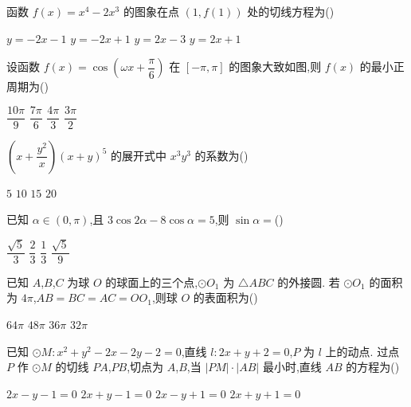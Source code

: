 \begin{problem}
函数 \(f(x)=x^4-2x^3\) 的图象在点 \(\left( 1,f\left( 1 \right) \right)\) 处的切线方程为(\quad)

\choices
    {\(y=-2x-1\)}
    {\(y=-2x+1\)}
    {\(y=2x-3\)}
    {\(y=2x+1\)}

\end{problem}

\begin{problem}
设函数 \(f(x)=\cos\left( \omega x+\dfrac{\pi}{6} \right)\) 在 \([-\pi,\pi]\) 的图象大致如图,则 \(f(x)\) 的最小正周期为(\quad)


\choices
    {\(\dfrac{10\pi}{9}\)}
    {\(\dfrac{7\pi}{6}\)}
    {\(\dfrac{4\pi}{3}\)}
    {\(\dfrac{3\pi}{2}\)}

\end{problem}

\begin{problem}
\(\left( x+\dfrac{y^2}{x} \right)\left( x+y \right)^5\) 的展开式中 \(x^3y^3\) 的系数为(\quad)

\choices
    {\(5\)}
    {\(10\)}
    {\(15\)}
    {\(20\)}

\end{problem}

\begin{problem}
已知 \(\alpha\in\left( 0,\pi \right)\),且 \(3\cos 2\alpha-8\cos\alpha=5\),则 \(\sin\alpha=\)(\quad)

\choices
    {\(\dfrac{\sqrt{5}}{3}\)}
    {\(\dfrac{2}{3}\)}
    {\(\dfrac{1}{3}\)}
    {\(\dfrac{\sqrt{5}}{9}\)}

\end{problem}

\begin{problem}
已知 \(A\),\(B\),\(C\) 为球 \(O\) 的球面上的三个点,\(\odot O_1\) 为 \(\triangle ABC\) 的外接圆. 若 \(\odot O_1\) 的面积为 \(4\pi\),\(AB=BC=AC=OO_1\),则球 \(O\) 的表面积为(\quad)

\choices
    {\(64\pi\)}
    {\(48\pi\)}
    {\(36\pi\)}
    {\(32\pi\)}

\end{problem}

\begin{problem}
已知 \(\odot M:x^2+y^2-2x-2y-2=0\),直线 \(l:2x+y+2=0\),\(P\) 为 \(l\) 上的动点. 过点 \(P\) 作 \(\odot M\) 的切线 \(PA\),\(PB\),切点为 \(A\),\(B\),当 \(\left\lvert PM \right\rvert\cdot \left\lvert AB \right\rvert\) 最小时,直线 \(AB\) 的方程为(\quad)

\choices
    {\(2x-y-1=0\)}
    {\(2x+y-1=0\)}
    {\(2x-y+1=0\)}
    {\(2x+y+1=0\)}

\end{problem}

